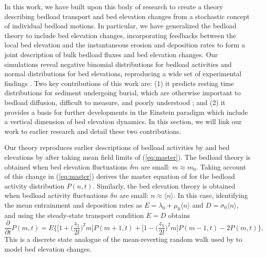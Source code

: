 \documentclass[draft]{agujournal2018}
\newcommand\be{\begin{equation}} %
\newcommand\ee{\end{equation}}   %
\newcommand\bra{\langle}
\newcommand\ket{\rangle}
\begin{document}
In this work, we have built upon this body of research to create a theory describing bedload transport and bed elevation changes from a stochastic concept of individual bedload motions.
In particular, we have generalized the \citet{Ancey2008} bedload theory to include bed elevation changes, incorporating feedbacks between the local bed elevation and the instantaneous erosion and deposition rates \citep[e.g.][]{Wong2007} to form a joint description of bulk bedload fluxes and bed elevation changes.
Our simulations reveal negative binomial distributions for bedload activities and normal distributions for bed elevations, reproducing a wide set of experimental findings \citep{Ancey2008, Heyman2016, Wong2007, Singh2009, Martin2014}.
Two key contributions of this work are: (1) it predicts resting time distributions for sediment undergoing burial, which are otherwise important to bedload diffusion, difficult to measure, and poorly understood \citep[e.g.][]{Voepel2013, Martin2014, Bradley2017}; and (2) it provides a basis for further developments in the Einstein paradigm which include a vertical dimension of bed elevation dynamics.
In this section, we will link our work to earlier research and detail these two contributions. 

Our theory reproduces earlier descriptions of bedload activities by \citet{Ancey2008} and bed elevations by \citet{Martin2014} after taking mean field limits of (\ref{eq:master}).
The \citet{Ancey2008} bedload theory is obtained when bed elevation fluctuations $\delta m$ are small: $m \approx m_0$.
Taking account of this change in (\ref{eq:master}) derives the master equation of \citet{Ancey2008} for the bedload activity distribution $P(n,t)$.
Similarly, the \citet{Martin2014} bed elevation theory is obtained when bedload activity fluctuations $\delta n$ are small: $n \approx \bra n \ket$.
In this case, identifying the mean entrainment and deposition rates as $E =\lambda_0 + \mu_0 \bra n \ket$ and $D = \sigma_0 \bra n \ket$, and using the steady-state transport condition $E=D$ \citep[e.g.][]{Einstein1950} obtains
\be \frac{\partial}{\partial t}P(m,t) =  E \Big\{ \Big[1 +\Big(\frac{z_1}{2 l}\Big)^2m\Big]P(m+1,t) +  \Big[1 -\Big(\frac{z_1}{2 l}\Big)^2m\Big]P(m-1,t) - 2P(m,t)\Big\}, \label{eq:ou}\ee
This is a discrete state analogue of the mean-reverting random walk used by \citet{Martin2014} to model bed elevation changes.
\end{document}
